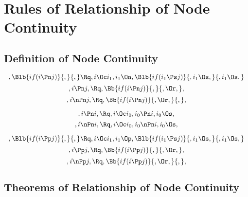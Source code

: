 \chapter{Rules of Relationship of Node Continuity}

\section{Definition of Node Continuity}
\[,\Blb{if(i \Pn j)}{,}{,} \Rq , i \Oc i_1, i_1 \On, \Blb{if(i_1 \Ps j)}{, i_1 \Os,}{, i_1 \Os,}\]
\bigskip
\bigskip
\[, i \Pn j, \Rq , \Bb{if(i \Pn j)}{,}{, \Or,},\]
\bigskip
\bigskip
\[, i \nPn j, \Rq , \Bb{if(i \Pn j)}{, \Or,}{,},\]
\bigskip
\bigskip

\[, i \Pn i, \Rq , i \Oc i_0, i_0 \Pn i, i_0 \Os,\]
\[, i \nPn i, \Rq , i \Oc i_0, i_0 \nPn i, i_0 \Os,\]
\bigskip
\bigskip


\bigskip
\bigskip
\[,\Blb{if(i \Pp j)}{,}{,} \Rq , i \Oc i_1, i_1 \Op, \Blb{if(i_1 \Ps j)}{, i_1 \Os,}{, i_1 \Os,}\]
\bigskip
\bigskip
\[, i \Pp j, \Rq , \Bb{if(i \Pp j)}{,}{, \Or,},\]
\bigskip
\bigskip
\[, i \nPp j, \Rq , \Bb{if(i \Pp j)}{, \Or,}{,},\]
\bigskip
\bigskip

\bigskip
\bigskip
\section{Theorems of Relationship of Node Continuity}
\bigskip
\bigskip
